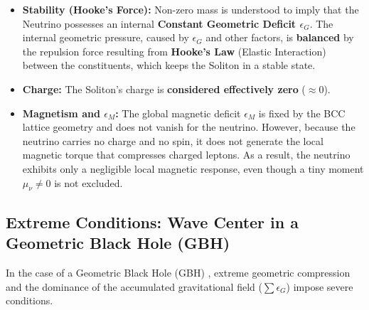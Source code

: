 \documentclass[10pt,a4paper]{article}
\begin{document}
\begin{itemize}
	\item \textbf{Stability (Hooke's Force):} Non-zero mass is understood to imply that the Neutrino possesses an internal \textbf{Constant Geometric Deficit \(\epsilon_{G}\)}. The internal geometric pressure, caused by \(\epsilon_{G}\) and other factors, is \textbf{balanced} by the repulsion force resulting from \textbf{Hooke's Law} (Elastic Interaction) between the constituents, which keeps the Soliton in a stable state.
	
	\item \textbf{Charge:} The Soliton's charge is \textbf{considered effectively zero} (\(\approx 0\)).
	
	\item \textbf{Magnetism and \(\epsilon_{M}\):} The global magnetic deficit \(\epsilon_M\) is fixed by the BCC lattice geometry and does not vanish for the neutrino. However, because the neutrino carries no charge and no spin, it does not generate the local magnetic torque that compresses charged leptons. As a result, the neutrino exhibits only a negligible local magnetic response, even though a tiny moment \(\mu_{\nu} \neq 0\) is not excluded.
\end{itemize}

\subsection{Extreme Conditions: Wave Center in a Geometric Black Hole (GBH)}

In the case of a Geometric Black Hole (GBH) \cite{yee2020geometric}, extreme geometric compression and the dominance of the accumulated gravitational field (\(\sum \epsilon_{G}\)) impose severe conditions.
\end{document}
